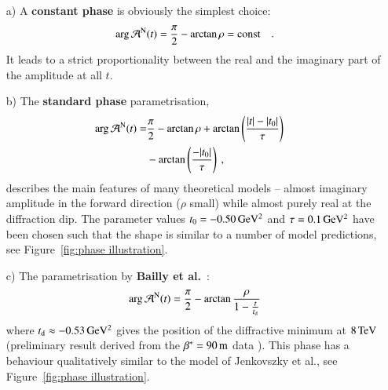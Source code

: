 \begin{enumerate}

\item[a)]
A {\bf constant phase} is obviously the simplest choice:
\begin{equation}
\label{eq:nuc phase con}
\arg {\cal A}^{\rm N}(t) = {\pi\over 2} - \arctan\rho = \hbox{const} \quad .
\end{equation}
It leads to a strict proportionality between the real and the imaginary part of the amplitude at all $t$.

\item[b)]
The {\bf standard phase} parametrisation,
\begin{equation}
\label{eqn:nuc phase std}
	\begin{aligned}
		\arg {\cal A}^{\rm N}(t) =	& {\pi\over 2} - \arctan\rho + \arctan \left(\frac{|t|-|t_{0}|}{\tau}\right)\cr
									&- \arctan \left(\frac{-|t_{0}|}{\tau}\right) \: ,
	\end{aligned}
\end{equation}
describes the main features of many theoretical models -- almost imaginary amplitude in the forward direction ($\rho$ small) while almost purely real at the diffraction dip. The parameter values $t_0 = - 0.50\,{\rm GeV^2}$ and $\tau = 0.1\,{\rm GeV^2}$ have been chosen such that the shape is similar to a number of model predictions, see Figure~\ref{fig:phase illustration}.

\item[c)]
The parametrisation by {\bf Bailly et al.}~\cite{bailly87}:
\begin{equation}
\label{eq:nuc phase bai}
	\arg {\cal A}^{\rm N}(t) = {\pi\over 2} - \arctan {\rho\over 1 - {t\over t_{\rm d}}}
\end{equation}
where $t_{\rm d} \approx -0.53\,{\rm GeV^2}$ gives the position of the diffractive minimum at $8\,{\rm TeV}$ (preliminary result derived from the $\beta^* = 90\,{\rm m}$ data \cite{8tev-90m}). This phase has a behaviour qualitatively similar to the model of Jenkovszky et al., see Figure~\ref{fig:phase illustration}.


\end{enumerate}
